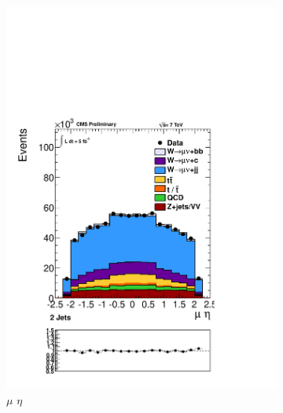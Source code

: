 \begin{figure}[hb]
\begin{subfigure}[b]{.45\textwidth}
	\includegraphics[trim = 0mm 52mm 0mm 0mm, clip,width=\textwidth]{images/muonEta.pdf}
	\caption[]{$\mu$    $\eta$}
    \end{subfigure}	
       \begin{subfigure}[b]{.45\textwidth}

\end{subfigure}
\end{figure}

